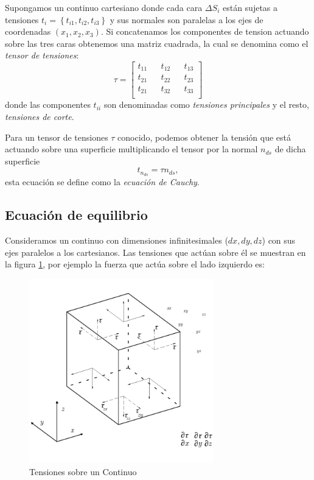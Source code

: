 \documentclass[a4paper,10pt, oneside]{book}
\begin{document}
Supongamos un continuo cartesiano donde cada cara $\Delta S_i$ están sujetas a tensiones $t_i = \left\lbrace t_{i1},t_{i2},t_{i3} \right\rbrace$ y sus normales son paralelas a los ejes de coordenadas $(x_1,x_2,x_3)$. Si concatenamos los componentes de tension actuando sobre las tres caras obtenemos una matriz cuadrada, la cual se denomina como el \textit{tensor de tensiones}:
\begin{equation}
	\tau = 
	\begin{bmatrix}
		t_{11} && t_{12} && t_{13} \\
		t_{21} && t_{22} && t_{23} \\
		t_{21} && t_{32} && t_{33} \\
	\end{bmatrix} \nonumber
\end{equation}
donde las componentes $t_{ii}$ son denominadas como \textit{tensiones principales} y el resto, \textit{tensiones de corte}.

Para un tensor de tensiones $\tau$ conocido, podemos obtener la tensión que está actuando sobre una superficie multiplicando el tensor por la normal $n_{ds}$ de dicha superficie 
\begin{equation}
	t_{n_{ds}} = \tau n_{ds}, \nonumber
\end{equation}
esta ecuación se define como la \textit{ecuación de Cauchy}.

\subsection{Ecuación de equilibrio}

Consideramos un continuo con dimensiones infinitesimales ($dx,dy,dz$) con sus ejes paralelos a los cartesianos. Las tensiones que actúan sobre él se muestran en la figura \ref{img:1-4}, por ejemplo la fuerza que actúa sobre el lado izquierdo es:
\begin{figure}[h!]
    \centering
    \includegraphics[width=8cm]{Img/1-4}
	\caption{Tensiones sobre un Continuo}
	\label{img:1-4}
\end{figure}
\end{document}
